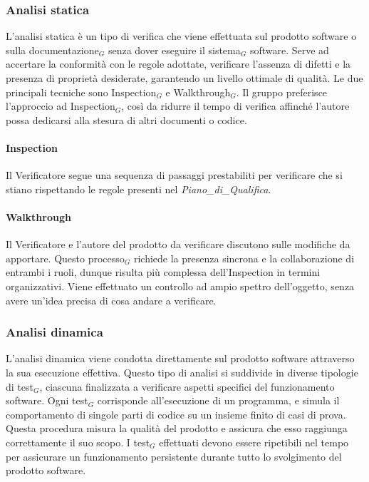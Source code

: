 \documentclass[10pt]{article}
\begin{document}
\begin{justify}
    \subsubsection{Analisi statica}
    L'analisi statica è un tipo di verifica che viene effettuata sul prodotto software o sulla documentazione$_G$ senza dover eseguire il sistema$_G$ software. Serve ad accertare la conformità con le regole adottate, verificare l'assenza di difetti e la presenza di proprietà desiderate, garantendo un livello ottimale di qualità. Le due principali tecniche sono Inspection$_G$ e Walkthrough$_G$. Il gruppo preferisce l'approccio ad Inspection$_G$, così da ridurre il tempo di verifica affinché l'autore possa dedicarsi alla stesura di altri documenti o codice.
    
    \paragraph{Inspection}
    Il Verificatore segue una sequenza di passaggi prestabiliti per verificare che si stiano rispettando le regole presenti nel \textit{Piano\_di\_Qualifica}.
    
    \paragraph{Walkthrough}
    Il Verificatore e l'autore del prodotto da verificare discutono sulle modifiche da apportare. Questo processo$_G$ richiede la presenza sincrona e la collaborazione di entrambi i ruoli, dunque risulta più complessa dell'Inspection in termini organizzativi. Viene effettuato un controllo ad ampio spettro dell'oggetto, senza avere un'idea precisa di cosa andare a verificare.

    \subsubsection{Analisi dinamica}
    L'analisi dinamica viene condotta direttamente sul prodotto software attraverso la sua esecuzione effettiva. Questo tipo di analisi si suddivide in diverse tipologie di test$_G$, ciascuna finalizzata a verificare aspetti specifici del funzionamento software. Ogni test$_G$ corrisponde all'esecuzione di un programma, e simula il comportamento di singole parti di codice su un insieme finito di casi di prova.\\
    Questa procedura misura la qualità del prodotto e assicura che esso raggiunga correttamente il suo scopo. I test$_G$ effettuati devono essere ripetibili nel tempo per assicurare un funzionamento persistente durante tutto lo svolgimento del prodotto software.
    

\end{justify}
\end{document}
